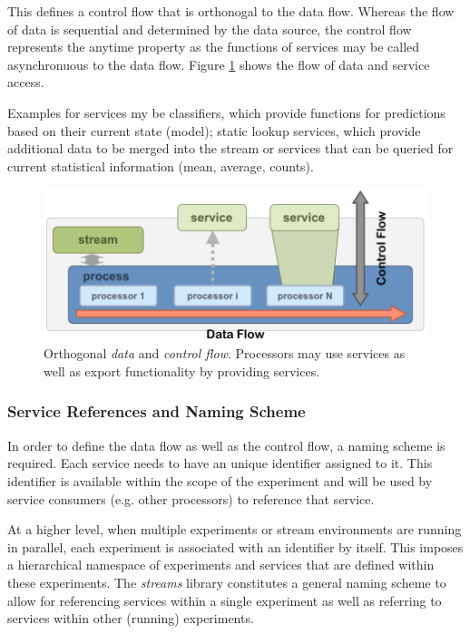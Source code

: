 This defines a control flow that is orthonogal to the data flow. Whereas
the flow of data is sequential and determined by the data source, the
control flow represents the anytime property as the functions of services
may be called asynchronuous to the data flow.
Figure \ref{fig:control} shows the flow of data and service access.

Examples for services my be classifiers, which provide functions for
predictions based on their current state (model); static lookup
services, which provide additional data to be merged into the stream
or services that can be queried for current statistical information
(mean, average, counts).

\begin{figure}[h!]
  \begin{center}
    \includegraphics[scale=0.35]{graphics/data-control-flow.png}
  \end{center}
  \caption{\label{fig:control}Orthogonal {\em data} and {\em control
      flow}. Processors may use services as well as export
    functionality by providing services.}
\end{figure}

\subsubsection*{Service References and Naming Scheme}
In order to define the data flow as well as the control flow, a naming
scheme is required. Each service needs to have an unique identifier assigned
to it. This identifier is available within the scope of the experiment and
will be used by service consumers (e.g. other processors) to reference that
service.

At a higher level, when multiple experiments or stream environments are running
in parallel, each experiment is associated with an identifier by itself. This
imposes a hierarchical namespace of experiments and services that are defined
within these experiments. The {\em streams} library constitutes a general
naming scheme to allow for referencing services within a single experiment
as well as referring to services within other (running) experiments.


